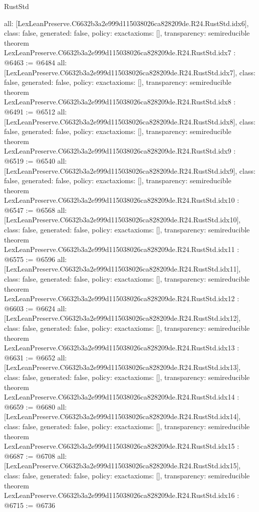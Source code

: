 \begin{lexlean}{RustStd}
\begin{coremodule}
{  all: [LexLeanPreserve.C6632b3a2e999d115038026ca828209de.R24.RustStd.idx6],
  class: false,
  generated: false,
  policy: exact{axioms: []},
  transparency: semireducible
}
theorem LexLeanPreserve.C6632b3a2e999d115038026ca828209de.R24.RustStd.idx7 : @6463 := @6484 {
  all: [LexLeanPreserve.C6632b3a2e999d115038026ca828209de.R24.RustStd.idx7],
  class: false,
  generated: false,
  policy: exact{axioms: []},
  transparency: semireducible
}
theorem LexLeanPreserve.C6632b3a2e999d115038026ca828209de.R24.RustStd.idx8 : @6491 := @6512 {
  all: [LexLeanPreserve.C6632b3a2e999d115038026ca828209de.R24.RustStd.idx8],
  class: false,
  generated: false,
  policy: exact{axioms: []},
  transparency: semireducible
}
theorem LexLeanPreserve.C6632b3a2e999d115038026ca828209de.R24.RustStd.idx9 : @6519 := @6540 {
  all: [LexLeanPreserve.C6632b3a2e999d115038026ca828209de.R24.RustStd.idx9],
  class: false,
  generated: false,
  policy: exact{axioms: []},
  transparency: semireducible
}
theorem LexLeanPreserve.C6632b3a2e999d115038026ca828209de.R24.RustStd.idx10 : @6547 := @6568 {
  all: [LexLeanPreserve.C6632b3a2e999d115038026ca828209de.R24.RustStd.idx10],
  class: false,
  generated: false,
  policy: exact{axioms: []},
  transparency: semireducible
}
theorem LexLeanPreserve.C6632b3a2e999d115038026ca828209de.R24.RustStd.idx11 : @6575 := @6596 {
  all: [LexLeanPreserve.C6632b3a2e999d115038026ca828209de.R24.RustStd.idx11],
  class: false,
  generated: false,
  policy: exact{axioms: []},
  transparency: semireducible
}
theorem LexLeanPreserve.C6632b3a2e999d115038026ca828209de.R24.RustStd.idx12 : @6603 := @6624 {
  all: [LexLeanPreserve.C6632b3a2e999d115038026ca828209de.R24.RustStd.idx12],
  class: false,
  generated: false,
  policy: exact{axioms: []},
  transparency: semireducible
}
theorem LexLeanPreserve.C6632b3a2e999d115038026ca828209de.R24.RustStd.idx13 : @6631 := @6652 {
  all: [LexLeanPreserve.C6632b3a2e999d115038026ca828209de.R24.RustStd.idx13],
  class: false,
  generated: false,
  policy: exact{axioms: []},
  transparency: semireducible
}
theorem LexLeanPreserve.C6632b3a2e999d115038026ca828209de.R24.RustStd.idx14 : @6659 := @6680 {
  all: [LexLeanPreserve.C6632b3a2e999d115038026ca828209de.R24.RustStd.idx14],
  class: false,
  generated: false,
  policy: exact{axioms: []},
  transparency: semireducible
}
theorem LexLeanPreserve.C6632b3a2e999d115038026ca828209de.R24.RustStd.idx15 : @6687 := @6708 {
  all: [LexLeanPreserve.C6632b3a2e999d115038026ca828209de.R24.RustStd.idx15],
  class: false,
  generated: false,
  policy: exact{axioms: []},
  transparency: semireducible
}
theorem LexLeanPreserve.C6632b3a2e999d115038026ca828209de.R24.RustStd.idx16 : @6715 := @6736 {
}
\end{coremodule}
\end{lexlean}
